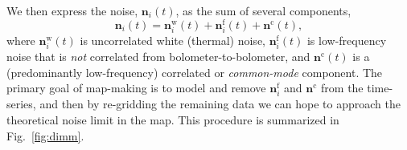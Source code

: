\documentclass[useAMS,usenatbib,nofootinbib]{mn2e}
\begin{document}
We then express the noise, $\mathbf{n}_i(t)$, as the sum of several
components,
%
\begin{equation}
  \mathbf{n}_i(t) = \mathbf{n}^\mathrm{w}_i(t) + \mathbf{n}^\mathrm{f}_i(t) +
  \mathbf{n}^\mathrm{c}(t),
\label{eq:noise}
\end{equation}
%
where $\mathbf{n}^\mathrm{w}_i(t)$ is uncorrelated white (thermal)
noise, $\mathbf{n}^\mathrm{f}_i(t)$ is low-frequency noise that is
\emph{not} correlated from bolometer-to-bolometer, and
$\mathbf{n}^\mathrm{c}(t)$ is a (predominantly low-frequency)
correlated or \emph{common-mode} component. The primary goal of
map-making is to model and remove $\mathbf{n}^\mathrm{f}_i$ and
$\mathbf{n}^\mathrm{c}$ from the time-series, and then by re-gridding
the remaining data we can hope to approach the theoretical noise limit
in the map. This procedure is summarized in Fig.~\ref{fig:dimm}.
\end{document}
